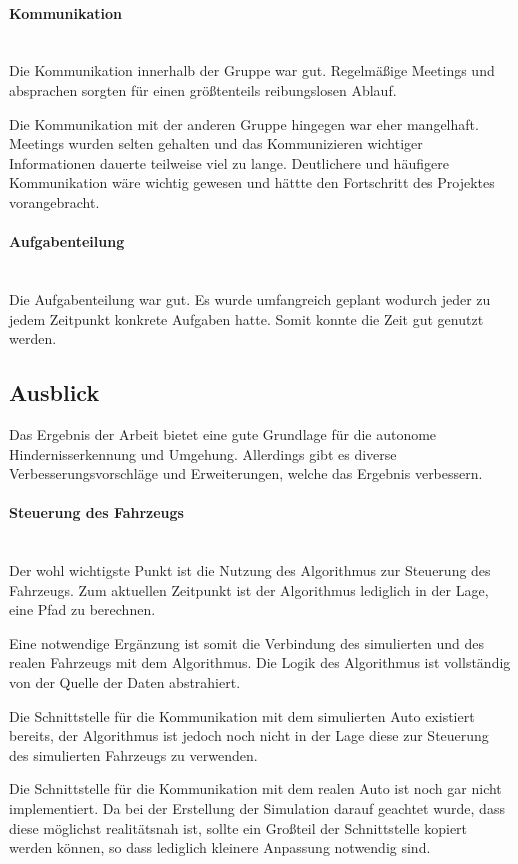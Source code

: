 \paragraph{Kommunikation} \mbox{}\\
Die Kommunikation innerhalb der Gruppe war gut.
Regelmäßige Meetings und absprachen sorgten für einen größtenteils reibungslosen Ablauf.

Die Kommunikation mit der anderen Gruppe hingegen war eher mangelhaft.
Meetings wurden selten gehalten und das Kommunizieren wichtiger Informationen dauerte teilweise viel zu lange.
Deutlichere und häufigere Kommunikation wäre wichtig gewesen und hättte den Fortschritt des Projektes vorangebracht.

\paragraph{Aufgabenteilung} \mbox{}\\
Die Aufgabenteilung war gut.
Es wurde umfangreich geplant wodurch jeder zu jedem Zeitpunkt konkrete Aufgaben hatte.
Somit konnte die Zeit gut genutzt werden.

\subsection{Ausblick}
Das Ergebnis der Arbeit bietet eine gute Grundlage für die autonome Hindernisserkennung und Umgehung.
Allerdings gibt es diverse Verbesserungsvorschläge und Erweiterungen, welche das Ergebnis verbessern.

\paragraph{Steuerung des Fahrzeugs} \mbox{}\\
Der wohl wichtigste Punkt ist die Nutzung des Algorithmus zur Steuerung des Fahrzeugs.
Zum aktuellen Zeitpunkt ist der Algorithmus lediglich in der Lage, eine Pfad zu berechnen.

Eine notwendige Ergänzung ist somit die Verbindung des simulierten und des realen Fahrzeugs mit dem Algorithmus.
Die Logik des Algorithmus ist vollständig von der Quelle der Daten abstrahiert.

Die Schnittstelle für die Kommunikation mit dem simulierten Auto existiert bereits,
der Algorithmus ist jedoch noch nicht in der Lage diese zur Steuerung des simulierten Fahrzeugs zu verwenden.

Die Schnittstelle für die Kommunikation mit dem realen Auto ist noch gar nicht implementiert.
Da bei der Erstellung der Simulation darauf geachtet wurde, dass diese möglichst realitätsnah ist,
sollte ein Großteil der Schnittstelle kopiert werden können, so dass lediglich kleinere Anpassung notwendig sind.

